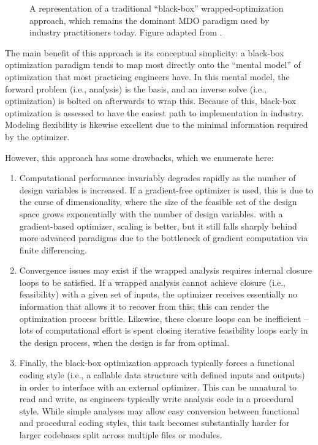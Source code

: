 \documentclass[12pt,vi,oneside]{report}
\begin{document}
\begin{appendices}
        \begin{figure}[H]
            \centering
            
            \caption{A representation of a traditional ``black-box'' wrapped-optimization approach, which remains the dominant MDO paradigm used by industry practitioners today. Figure adapted from \cite{drela_simultaneous_2010}.}
            \label{fig:nested}
        \end{figure}

        The main benefit of this approach is its conceptual simplicity: a black-box optimization paradigm tends to map most directly onto the ``mental model'' of optimization that most practicing engineers have. In this mental model, the forward problem (i.e., analysis) is the basis, and an inverse solve (i.e., optimization) is bolted on afterwards to wrap this. Because of this, black-box optimization is assessed to have the easiest path to implementation in industry. Modeling flexibility is likewise excellent due to the minimal information required by the optimizer.

        However, this approach has some drawbacks, which we enumerate here:
        \begin{enumerate}
            \item Computational performance invariably degrades rapidly as the number of design variables is increased. If a gradient-free optimizer is used, this is due to the curse of dimensionality, where the size of the feasible set of the design space grows exponentially with the number of design variables. with a gradient-based optimizer, scaling is better, but it still falls sharply behind more advanced paradigms due to the bottleneck of gradient computation via finite differencing.
            \item Convergence issues may exist if the wrapped analysis requires internal closure loops to be satisfied. If a wrapped analysis cannot achieve closure (i.e., feasibility) with a given set of inputs, the optimizer receives essentially no information that allows it to recover from this; this can render the optimization process brittle. Likewise, these closure loops can be inefficient -- lots of computational effort is spent closing iterative feasibility loops early in the design process, when the design is far from optimal.
            \item Finally, the black-box optimization approach typically forces a functional coding style (i.e., a callable data structure with defined inputs and outputs) in order to interface with an external optimizer. This can be unnatural to read and write, as engineers typically write analysis code in a procedural style. While simple analyses may allow easy conversion between functional and procedural coding styles, this task becomes substantially harder for larger codebases split across multiple files or modules.
        \end{enumerate}


\end{appendices}
\end{document}
